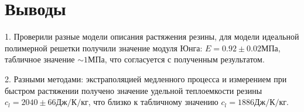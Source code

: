 \documentclass[a4paper,12pt]{article} %
\begin{document}
\section{Выводы}

1. Проверили разные модели описания растяжения резины, для модели идеальной полимерной решетки получили значение модуля Юнга: $E = 0.92 \pm 0.02 МПа$, табличное значение $\sim 1 МПа$, что согласуется с полученным результатом.

2. Разными методами: экстраполяцией медленного процесса и измерением при быстром растяжении получено значение удельной теплоемкости резины $c_l = 2040 \pm 66 Дж/К/кг$, что близко к табличному значению $c_l = 1886 Дж/К/кг$.
\end{document}
